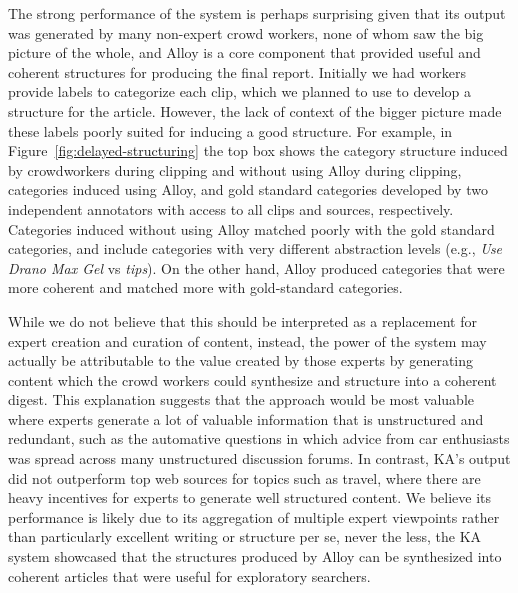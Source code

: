 The strong performance of the system is perhaps surprising given that its output was generated by many non-expert crowd workers, none of whom saw the big picture of the whole, and Alloy is a core component that provided useful and coherent structures for producing the final report. Initially we had workers provide labels to categorize each clip, which we planned to use to develop a structure for the article. However, the lack of context of the bigger picture made these labels poorly suited for inducing a good structure. For example, in Figure~\ref{fig:delayed-structuring} the top box shows the category structure induced by crowdworkers during clipping and without using Alloy during clipping, categories induced using Alloy, and gold standard categories developed by two independent annotators with access to all clips and sources, respectively. Categories induced without using Alloy matched poorly with the gold standard categories, and include categories with very different abstraction levels (e.g., \textit{Use Drano Max Gel} vs \textit{tips}). On the other hand, Alloy produced categories that were more coherent and matched more with gold-standard categories.

While we do not believe that this should be interpreted as a replacement for expert creation and curation of content, instead, the power of the system may actually be attributable to the value created by those experts by generating content which the crowd workers could synthesize and structure into a coherent digest. This explanation suggests that the approach would be most valuable where experts generate a lot of valuable information that is unstructured and redundant, such as the automative questions in which advice from car enthusiasts was spread across many unstructured discussion forums. In contrast, KA's output did not outperform top web sources for topics such as travel, where there are heavy incentives for experts to generate well structured content.  We believe its performance is likely due to its aggregation of multiple expert viewpoints rather than particularly excellent writing or structure per se, never the less, the KA system showcased that the structures produced by Alloy can be synthesized into coherent articles that were useful for exploratory searchers.

